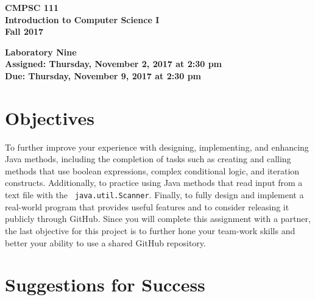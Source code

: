 \documentclass[11pt]{article}
\newcommand{\assignmentduedate}{November 9}
\newcommand{\assignmentassignedate}{November 2}
\newcommand{\assignmentnumber}{Nine}
\newcommand{\labyear}{2017}
\newcommand{\labday}{Thursday}
\newcommand{\labtime}{2:30 pm}
\newcommand{\assigneddate}{Assigned: \labday, \assignmentassignedate, \labyear{} at \labtime{}}
\newcommand{\duedate}{Due: \labday, \assignmentduedate, \labyear{} at \labtime{}}
\newcommand{\labtitle}[1]
{
  \begin{center}
    \begin{center}
      \bf
      CMPSC 111\\Introduction to Computer Science I\\
      Fall 2017\\
      \medskip
    \end{center}
    \bf
    #1
  \end{center}
}
\begin{document}
\thispagestyle{empty}

\labtitle{Laboratory \assignmentnumber{} \\ \assigneddate{} \\ \duedate{}}

\section*{Objectives}

To further improve your experience with designing, implementing, and enhancing Java methods, including the completion of
tasks such as creating and calling methods that use boolean expressions, complex conditional logic, and iteration
constructs. Additionally, to practice using Java methods that read input from a text file with the {\tt
java.util.Scanner}. Finally, to fully design and implement a real-world program that provides useful features and to
consider releasing it publicly through GitHub. Since you will complete this assignment with a partner, the last
objective for this project is to further hone your team-work skills and better your ability to use a shared GitHub
repository.

\section*{Suggestions for Success}
\end{document}
